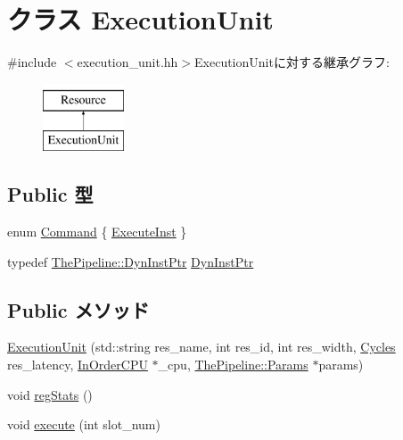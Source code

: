 \hypertarget{classExecutionUnit}{
\section{クラス ExecutionUnit}
\label{classExecutionUnit}
}


{\ttfamily \#include $<$execution\_\-unit.hh$>$}ExecutionUnitに対する継承グラフ:\begin{figure}[H]
\begin{center}
\leavevmode
\includegraphics[height=2cm]{classExecutionUnit}
\end{center}
\end{figure}
\subsection*{Public 型}
\begin{DoxyCompactItemize}
\item 
enum \hyperlink{classExecutionUnit_a2afce0a47a93eee73a314d53e4890153}{Command} \{ \hyperlink{classExecutionUnit_a2afce0a47a93eee73a314d53e4890153a50945a7008a230660c285c62a9708066}{ExecuteInst}
 \}
\item 
typedef \hyperlink{classRefCountingPtr}{ThePipeline::DynInstPtr} \hyperlink{classExecutionUnit_af9d0c8a46736ba6aa2d8bb94da1a5e73}{DynInstPtr}
\end{DoxyCompactItemize}
\subsection*{Public メソッド}
\begin{DoxyCompactItemize}
\item 
\hyperlink{classExecutionUnit_a05c170b2ead38efc8ad22aaa5a5d53b0}{ExecutionUnit} (std::string res\_\-name, int res\_\-id, int res\_\-width, \hyperlink{classCycles}{Cycles} res\_\-latency, \hyperlink{classInOrderCPU}{InOrderCPU} $\ast$\_\-cpu, \hyperlink{namespaceThePipeline_ab62ca16eeca26566ad2422b5df4943ce}{ThePipeline::Params} $\ast$params)
\item 
void \hyperlink{classExecutionUnit_a4dc637449366fcdfc4e764cdf12d9b11}{regStats} ()
\item 
void \hyperlink{classExecutionUnit_a7b7fff82f8c9cbdb02add1346f60bb9e}{execute} (int slot\_\-num)
\end{DoxyCompactItemize}

